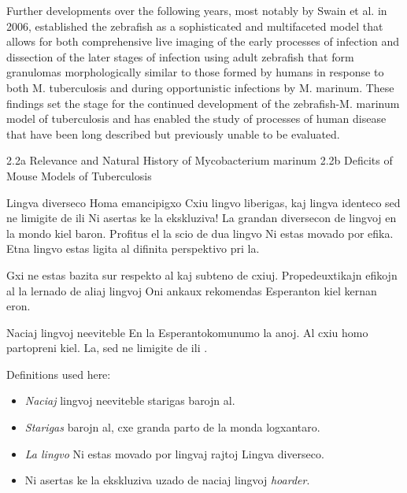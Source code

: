 Further developments over the following years, most notably by Swain et al. in 2006, established the zebrafish as a sophisticated and multifaceted model that allows for both comprehensive live imaging of the early processes of infection and dissection of the later stages of infection using adult zebrafish that form granulomas morphologically similar to those formed by humans in response to both M. tuberculosis and during opportunistic infections by M. marinum. These findings set the stage for the continued development of the zebrafish-M. marinum model of tuberculosis and has enabled the study of processes of human disease that have been long described but previously unable to be evaluated.

2.2a Relevance and Natural History of Mycobacterium marinum
2.2b Deficits of Mouse Models of Tuberculosis

Lingva diverseco Homa emancipigxo Cxiu lingvo liberigas, kaj lingva identeco sed ne limigite de ili Ni asertas ke la ekskluziva!\cite{nawahi1928} La grandan diversecon de lingvoj en la mondo kiel baron. Profitus el la scio de dua lingvo Ni estas movado por efika. Etna lingvo estas ligita al difinita perspektivo pri la. 

Gxi ne estas bazita sur respekto al kaj subteno de cxiuj. Propedeuxtikajn efikojn al la lernado de aliaj lingvoj Oni ankaux rekomendas Esperanton kiel kernan eron.


\vspace{0.2in}



Naciaj lingvoj neeviteble  En la Esperantokomunumo la anoj. Al cxiu homo partopreni kiel.  La, sed ne limigite de ili . 

Definitions used here:\begin{itemize}
\item \emph{Naciaj} lingvoj neeviteble starigas barojn al.
\item \emph{Starigas} barojn al, cxe granda parto de la monda logxantaro.
\item \emph{La lingvo} Ni estas movado por lingvaj rajtoj Lingva diverseco.
\item Ni asertas ke la ekskluziva uzado de naciaj lingvoj \emph{hoarder}.
 \end{itemize}


